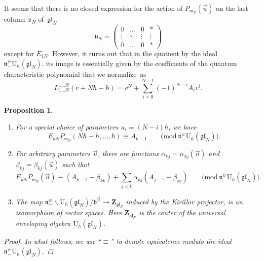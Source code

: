 \documentclass[10pt,a4paper]{amsart}
\numberwithin{equation}{section}
\newtheorem{Proposition}[Theorem]{Proposition}
{ \theoremstyle{definition}
	\newtheorem{Definition}[Theorem]{Definition}
	\newtheorem{Note}[Theorem]{Note}
	\newtheorem{Example}[Theorem]{Example}
	\newtheorem{Remark}[Theorem]{Remark} }
\newcommand{\U}{\mathrm{U}_{\hbar}}
\newcommand{\Z}{\mathbf{Z}}
\renewcommand{\b}{\mathfrak{b}}
\newcommand{\n}{\mathfrak{n}}
\renewcommand{\u}{\mathfrak{u}}
\newcommand{\m}{\mathfrak{m}}
\newcommand{\gl}{\mathfrak{gl}}
\begin{document}
	
	It seems that there is no closed expression for the action of $P_{\m_N}(\vec{u})$ on the last column $\u_N$ of~$\gl_N$
	\[
	\u_N = \begin{pmatrix}
		0 & \dots & 0 & * \\
		\vdots & \ddots & \vdots & \vdots \\
		0 & \dots & 0 & *
	\end{pmatrix}
	\]
	except for $E_{1N}$. However, it turns out that in the quotient by the ideal $\n_-^{\psi} \U(\gl_N)$, its image is essentially given by the coefficients of the quantum characteristic polynomial that we normalize~as
	\[%
		L_{1\dots N}^{1\dots N}(v+N\hbar - \hbar) = v^N + \sum_{i=0}^{N-1} (-1)^{N-i} A_i v^i.
	\]
	\begin{Proposition}\quad
		\label{prop::last_col_center_iso}
		\begin{enumerate}\itemsep=0pt
			\item[$(1)$] For a special choice of parameters $u_i = (N-i)\hbar$, we have
			\[
			E_{kN} P_{\m_N}(N\hbar-\hbar,\dots,\hbar) \equiv A_{k-1} \qquad \bigl(\mathrm{mod}\ \n_-^{\psi} \U(\gl_N)\bigr).
			\]
			
			\item[$(2)$] For arbitrary parameters $\vec{u}$, there are functions $\alpha_{kj} = \alpha_{kj}(\vec{u})$ and $\beta_{kj} = \beta_{kj}(\vec{u})$ such that
			\[
			E_{kN} P_{\m_N} (\vec{u}) \equiv (A_{k-1} - \beta_{kk}) + \sum_{j < k} \alpha_{kj} (A_{j-1}-\beta_{kj}) \qquad \bigl(\mathrm{mod}\ \n_-^{\psi} \U(\gl_N)\bigr).
			\]
			
			\item[$(3)$] The map
			$
				\n_-^{\psi} \backslash \U(\gl_N) / \b^{\vec{u}} \rightarrow \Z_{\gl_N}$
			induced by the Kirillov projector, is an isomorphism of vector spaces. Here $\Z_{\gl_N}$ is the center of the universal enveloping algebra $\U(\gl_N)$.
		\end{enumerate}
		
		\begin{proof}
			In what follows, we use ``$\equiv$'' to denote equivalence modulo the ideal $\n_-^{\psi} \U(\gl_N)$.
			

\end{proof}
\end{Proposition}
\end{document}
